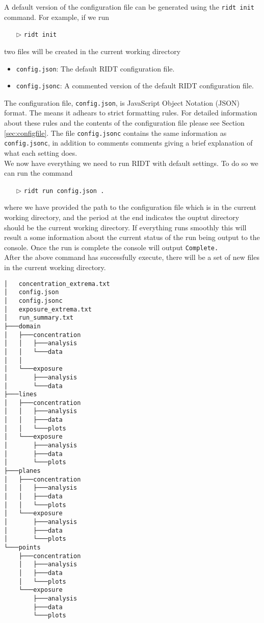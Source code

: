 \documentclass[]{article}
\def\code#1{\texttt{#1}}
\begin{document}
\noindent A default version of the configuration file can be generated using the
\code{ridt init} command. For example, if we run
\begin{itemize}
    \item[$\triangleright$] \code{ridt init}
\end{itemize}
two files will be created in the current working directory
\begin{itemize}
    \item \code{config.json}: The default RIDT configuration file.
    \item \code{config.jsonc}: A commented version of the default RIDT
    configuration file.
\end{itemize}

\noindent The configuration file, \code{config.json}, is JavaScript Object
Notation (JSON) format. The means it adhears to strict formatting rules. For
detailed information about these rules and the contents of the configuration
file please see Section \ref{sec:configfile}. The file \code{config.jsonc}
contains the same information as \code{config.jsonc}, in addition to comments
comments giving a brief explanation of what each setting does.\\

\noindent We now have everything we need to run RIDT with default settings. To
do so we can run the command 
\begin{itemize}
    \item[$\triangleright$] \code{ridt run config.json .}
\end{itemize}

\noindent where we have provided the path to the configuration file which is in
the current working directory, and the period at the end indicates the ouptut
directory should be the current working directory. If everything runs smoothly
this will result a some information about the current status of the run being
output to the console. Once the run is complete the console will output
\code{Complete.}\\

\noindent After the above command has successfully execute, there will be a set
of new files in the current working directory.

\begin{verbatim}
│   concentration_extrema.txt
│   config.json
│   config.jsonc
│   exposure_extrema.txt
│   run_summary.txt
├───domain
│   ├───concentration
│   │   ├───analysis
│   │   └───data
│   │
│   └───exposure
│       ├───analysis
│       └───data
├───lines
│   ├───concentration
│   │   ├───analysis
│   │   ├───data
│   │   └───plots
│   └───exposure
│       ├───analysis
│       ├───data
│       └───plots
├───planes
│   ├───concentration
│   │   ├───analysis
│   │   ├───data
│   │   └───plots
│   └───exposure
│       ├───analysis
│       ├───data
│       └───plots
└───points
    ├───concentration
    │   ├───analysis
    │   ├───data
    │   └───plots
    └───exposure
        ├───analysis
        ├───data
        └───plots
\end{verbatim}
\end{document}
